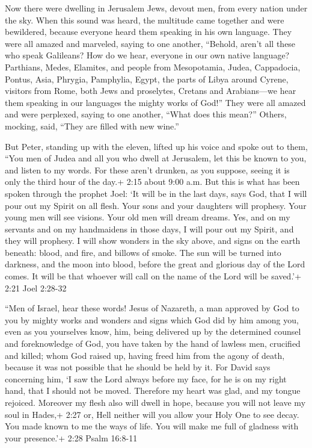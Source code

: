  Now there were dwelling in Jerusalem Jews, devout men, from
every nation under the sky.  When this sound was heard, the
multitude came together and were bewildered, because everyone heard them
speaking in his own language.  They were all amazed and
marveled, saying to one another, ``Behold, aren't all these who speak
Galileans?  How do we hear, everyone in our own native
language?  Parthians, Medes, Elamites, and people from
Mesopotamia, Judea, Cappadocia, Pontus, Asia,  Phrygia,
Pamphylia, Egypt, the parts of Libya around Cyrene, visitors from Rome,
both Jews and proselytes,  Cretans and Arabians---we hear
them speaking in our languages the mighty works of God!'' 
They were all amazed and were perplexed, saying to one another, ``What
does this mean?''  Others, mocking, said, ``They are filled
with new wine.''

 But Peter, standing up with the eleven, lifted up his
voice and spoke out to them, ``You men of Judea and all you who dwell at
Jerusalem, let this be known to you, and listen to my words.
 For these aren't drunken, as you suppose, seeing it is
only the third hour of the day.+ 2:15 about 9:00 a.m.  But
this is what has been spoken through the prophet Joel:  `It
will be in the last days, says God, that I will pour out my Spirit on
all flesh. Your sons and your daughters will prophesy. Your young men
will see visions. Your old men will dream dreams.  Yes, and
on my servants and on my handmaidens in those days, I will pour out my
Spirit, and they will prophesy.  I will show wonders in the
sky above, and signs on the earth beneath: blood, and fire, and billows
of smoke.  The sun will be turned into darkness, and the
moon into blood, before the great and glorious day of the Lord comes.
 It will be that whoever will call on the name of the Lord
will be saved.'+ 2:21 Joel 2:28-32

 ``Men of Israel, hear these words! Jesus of Nazareth, a
man approved by God to you by mighty works and wonders and signs which
God did by him among you, even as you yourselves know, 
him, being delivered up by the determined counsel and foreknowledge of
God, you have taken by the hand of lawless men, crucified and killed;
 whom God raised up, having freed him from the agony of
death, because it was not possible that he should be held by it.
 For David says concerning him, `I saw the Lord always
before my face, for he is on my right hand, that I should not be moved.
 Therefore my heart was glad, and my tongue rejoiced.
Moreover my flesh also will dwell in hope,  because you
will not leave my soul in Hades,+ 2:27 or, Hell neither will you allow
your Holy One to see decay.  You made known to me the ways
of life. You will make me full of gladness with your presence.'+ 2:28
Psalm 16:8-11

